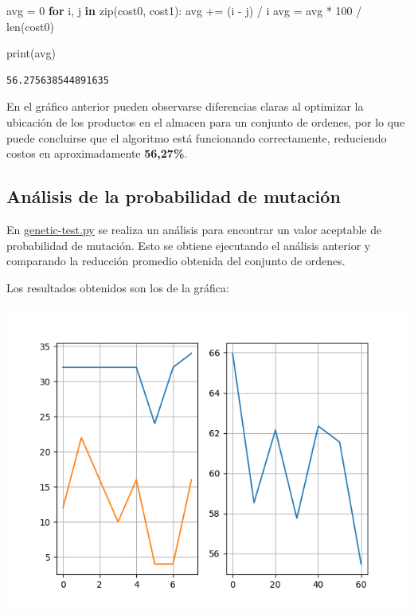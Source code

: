 \documentclass[
]{article}
\newenvironment{Shaded}{}{}
\newcommand{\BuiltInTok}[1]{#1}
\newcommand{\ControlFlowTok}[1]{\textcolor[rgb]{0.00,0.44,0.13}{\textbf{#1}}}
\newcommand{\DecValTok}[1]{\textcolor[rgb]{0.25,0.63,0.44}{#1}}
\newcommand{\KeywordTok}[1]{\textcolor[rgb]{0.00,0.44,0.13}{\textbf{#1}}}
\newcommand{\NormalTok}[1]{#1}
\newcommand{\OperatorTok}[1]{\textcolor[rgb]{0.40,0.40,0.40}{#1}}
\begin{document}
\begin{Shaded}
\begin{Highlighting}[]
\NormalTok{avg }\OperatorTok{=} \DecValTok{0}
\ControlFlowTok{for}\NormalTok{ i, j }\KeywordTok{in} \BuiltInTok{zip}\NormalTok{(cost0, cost1):}
\NormalTok{    avg }\OperatorTok{+=}\NormalTok{ (i }\OperatorTok{-}\NormalTok{ j) }\OperatorTok{/}\NormalTok{ i}
\NormalTok{avg }\OperatorTok{=}\NormalTok{ avg }\OperatorTok{*} \DecValTok{100} \OperatorTok{/} \BuiltInTok{len}\NormalTok{(cost0)}

\BuiltInTok{print}\NormalTok{(avg)}
\end{Highlighting}
\end{Shaded}

\begin{verbatim}
56.275638544891635
\end{verbatim}

En el gráfico anterior pueden observarse diferencias claras al optimizar
la ubicación de los productos en el almacen para un conjunto de ordenes,
por lo que puede concluirse que el algoritmo está funcionando
correctamente, reduciendo costos en aproximadamente \textbf{56,27\%}.

\hypertarget{anuxe1lisis-de-la-probabilidad-de-mutaciuxf3n}{%
\subsection{Análisis de la probabilidad de
mutación}\label{anuxe1lisis-de-la-probabilidad-de-mutaciuxf3n}}

En \href{./genetic-test.py}{genetic-test.py} se realiza un análisis para
encontrar un valor aceptable de probabilidad de mutación. Esto se
obtiene ejecutando el análisis anterior y comparando la reducción
promedio obtenida del conjunto de ordenes.

Los resultados obtenidos son los de la gráfica:

\includegraphics{genetic_test.png}
\end{document}
